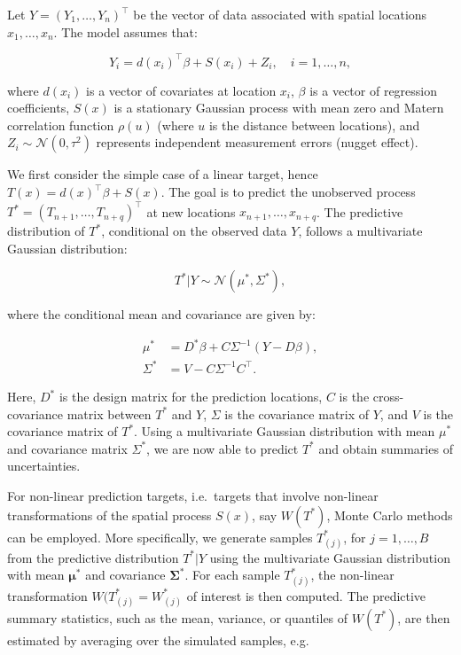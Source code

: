 \documentclass[
  letterpaper,
]{krantz}
\begin{document}
Let \(Y = (Y_1, \ldots, Y_n)^\top\) be the vector of data associated
with spatial locations \(x_1, \ldots, x_n\). The model assumes that:

\begin{equation}
Y_i = d(x_i)^\top {\beta} + S(x_i) + Z_i, \quad i = 1, \ldots, n,
\end{equation}

where \(d(x_i)\) is a vector of covariates at location \(x_i\),
\({\beta}\) is a vector of regression coefficients, \(S(x)\) is a
stationary Gaussian process with mean zero and Matern correlation
function \(\rho(u)\) (where \(u\) is the distance between locations),
and \(Z_i \sim \mathcal{N}(0, \tau^2)\) represents independent
measurement errors (nugget effect).

We first consider the simple case of a linear target, hence
\(T(x) = d(x)^\top {\beta} + S(x)\). The goal is to predict the
unobserved process \(T^* = (T_{n+1}, \ldots, T_{n+q})^\top\) at new
locations \(x_{n+1}, \ldots, x_{n+q}\). The predictive distribution of
\(T^*\), conditional on the observed data \(Y\), follows a multivariate
Gaussian distribution:

\begin{equation}
T^* | Y \sim \mathcal{N}(\mu^*, \Sigma^*),
\end{equation}

where the conditional mean and covariance are given by:

\begin{align}
\mu^* &= D^* {\beta} + C \Sigma^{-1} (Y - D {\beta}), \\
{\Sigma}^* &= V - C \Sigma^{-1} C^\top.
\end{align}

Here, \(D^*\) is the design matrix for the prediction locations, \(C\)
is the cross-covariance matrix between \(T^*\) and \(Y\), \(\Sigma\) is
the covariance matrix of \(Y\), and \(V\) is the covariance matrix of
\(T^*\). Using a multivariate Gaussian distribution with mean \(\mu^*\)
and covariance matrix \(\Sigma^*\), we are now able to predict \(T^*\)
and obtain summaries of uncertainties.

For non-linear prediction targets, i.e.~targets that involve non-linear
transformations of the spatial process \(S(x)\), say \(W(T^*)\), Monte
Carlo methods can be employed. More specifically, we generate samples
\(T_{(j)}^*\), for \(j=1,\ldots,B\) from the predictive distribution
\(T^* | Y\) using the multivariate Gaussian distribution with mean
\(\boldsymbol{\mu}^*\) and covariance \(\boldsymbol{\Sigma}^*\). For
each sample \(T^{*}_{(j)}\), the non-linear transformation
\(W(T^{*}_{(j)} = W^{*}_{(j)}\) of interest is then computed. The
predictive summary statistics, such as the mean, variance, or quantiles
of \(W(T^*)\), are then estimated by averaging over the simulated
samples, e.g.
\end{document}

